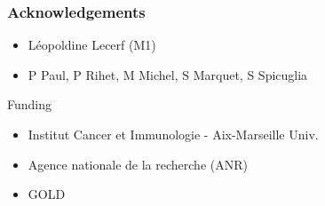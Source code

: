 \documentclass{beamer}
\newcommand*{\floatRelativePath}{../out/gwas417/pval_5e-08/r2_0.1/kb_1000/window_1000000/75_50}%
\begin{document}
        \begin{frame}
            \frametitle{Acknowledgements}

            \begin{itemize}
                \item L\'eopoldine Lecerf (M1)
                \item P Paul, P Rihet, M Michel, S Marquet, S Spicuglia
            \end{itemize}
%
            \vfill
%
            Funding
%
            \begin{itemize}
                \item Institut Cancer et Immunologie - Aix-Marseille Univ.
                \item Agence nationale de la recherche (ANR)
                \item GOLD
            \end{itemize}

        \end{frame}

        \begin{frame}
            \frametitle{}

        \end{frame}

%
%

    
\end{document}
